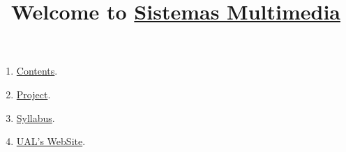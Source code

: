 
%
\title{Welcome to \href{https://github.com/Sistemas-Multimedia}{Sistemas Multimedia}}

\maketitle

\begin{enumerate}
\item \href{https://sistemas-multimedia.github.io/contents}{Contents}.
\item \href{https://github.com/Sistemas-Multimedia/VCF}{Project}.
\item \href{https://sistemas-multimedia.github.io/syllabus}{Syllabus}.
\item \href{https://www.ual.es/estudios/masteres/presentacion/plandeestudios/asignatura/7114/71142105}{UAL's WebSite}.
\end{enumerate}

